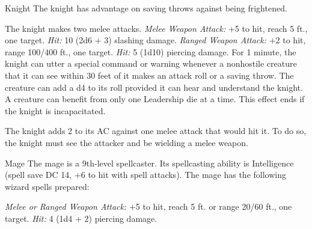 \documentclass[10pt,a4paper,twoside,twocolumn,openany,bg=print,nodeprecatedcode]{dndbook}
\begin{document}
\begin{DndMonster}[float*=t]{Knight}
\DndMonsterBasics[
armor-class = {18 (plate armor)},
hit-points = {\DndDice{8d8 + 16}},
speed = {30 ft.}
]
\DndMonsterAbilityScores[
 str = 16,
 dex = 11,
 con = 14,
 int = 11,
 wis = 11,
 cha = 15
]
\DndMonsterDetails[
saving-throws = {Con +4, Wis +2},
languages = {any one language (usually Common)},
challenge = 3,
]
The knight has advantage on saving throws against being frightened.
\par
{}
The knight makes two melee attacks.
\textsl{Melee Weapon Attack:} +5 to hit, reach 5 ft., one target. \textsl{Hit:} 10 (2d6 + 3) slashing damage.
\textsl{Ranged Weapon Attack:} +2 to hit, range 100/400 ft., one target. \textsl{Hit:} 5 (1d10) piercing damage.
For 1 minute, the knight can utter a special command or warning whenever a nonhostile creature that it can see within 30 feet of it makes an attack roll or a saving throw. The creature can add a d4 to its roll provided it can hear and understand the knight. A creature can benefit from only one Leadership die at a time. This effect ends if the knight is incapacitated.
\par
{}
The knight adds 2 to its AC against one melee attack that would hit it. To do so, the knight must see the attacker and be wielding a melee weapon.
\end{DndMonster}


\clearpage

\begin{DndMonster}[float*=t]{Mage}
\DndMonsterBasics[
armor-class = {12 (15 with mage armor)},
hit-points = {\DndDice{9d8}},
speed = {30 ft.}
]
\DndMonsterAbilityScores[
 str = 9,
 dex = 14,
 con = 11,
 int = 17,
 wis = 12,
 cha = 11
]
\DndMonsterDetails[
saving-throws = {Int +6, Wis +4},
skills = {Arcana +6, History +6},
languages = {any four languages},
challenge = 6,
]
The mage is a 9th-level spellcaster. Its spellcasting ability is Intelligence (spell save DC 14, +6 to hit with spell attacks). The mage has the following wizard spells prepared:
\begin{DndMonsterSpells}
\end{DndMonsterSpells}
\par
{}
\textsl{Melee or Ranged Weapon Attack:} +5 to hit, reach 5 ft. or range 20/60 ft., one target. \textsl{Hit:} 4 (1d4 + 2) piercing damage.
\end{DndMonster}
\end{document}
